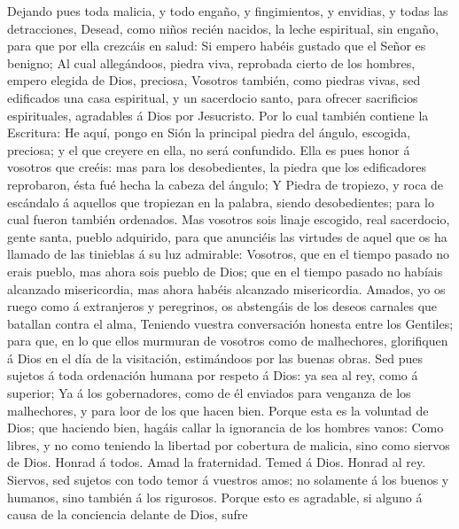  Dejando pues toda malicia, y todo engaño, y fingimientos,
y envidias, y todas las detracciones,  Desead, como niños
recién nacidos, la leche espiritual, sin engaño, para que por ella
crezcáis en salud:  Si empero habéis gustado que el Señor
es benigno;  Al cual allegándoos, piedra viva, reprobada
cierto de los hombres, empero elegida de Dios, preciosa, 
Vosotros también, como piedras vivas, sed edificados una casa
espiritual, y un sacerdocio santo, para ofrecer sacrificios
espirituales, agradables á Dios por Jesucristo.  Por lo
cual también contiene la Escritura: He aquí, pongo en Sión la principal
piedra del ángulo, escogida, preciosa; y el que creyere en ella, no será
confundido.  Ella es pues honor á vosotros que creéis: mas
para los desobedientes, la piedra que los edificadores reprobaron, ésta
fué hecha la cabeza del ángulo;  Y Piedra de tropiezo, y
roca de escándalo á aquellos que tropiezan en la palabra, siendo
desobedientes; para lo cual fueron también ordenados.  Mas
vosotros sois linaje escogido, real sacerdocio, gente santa, pueblo
adquirido, para que anunciéis las virtudes de aquel que os ha llamado de
las tinieblas á su luz admirable:  Vosotros, que en el
tiempo pasado no erais pueblo, mas ahora sois pueblo de Dios; que en el
tiempo pasado no habíais alcanzado misericordia, mas ahora habéis
alcanzado misericordia.  Amados, yo os ruego como á
extranjeros y peregrinos, os abstengáis de los deseos carnales que
batallan contra el alma,  Teniendo vuestra conversación
honesta entre los Gentiles; para que, en lo que ellos murmuran de
vosotros como de malhechores, glorifiquen á Dios en el día de la
visitación, estimándoos por las buenas obras.  Sed pues
sujetos á toda ordenación humana por respeto á Dios: ya sea al rey, como
á superior;  Ya á los gobernadores, como de él enviados
para venganza de los malhechores, y para loor de los que hacen bien.
 Porque esta es la voluntad de Dios; que haciendo bien,
hagáis callar la ignorancia de los hombres vanos:  Como
libres, y no como teniendo la libertad por cobertura de malicia, sino
como siervos de Dios.  Honrad á todos. Amad la
fraternidad. Temed á Dios. Honrad al rey.  Siervos, sed
sujetos con todo temor á vuestros amos; no solamente á los buenos y
humanos, sino también á los rigurosos.  Porque esto es
agradable, si alguno á causa de la conciencia delante de Dios, sufre
